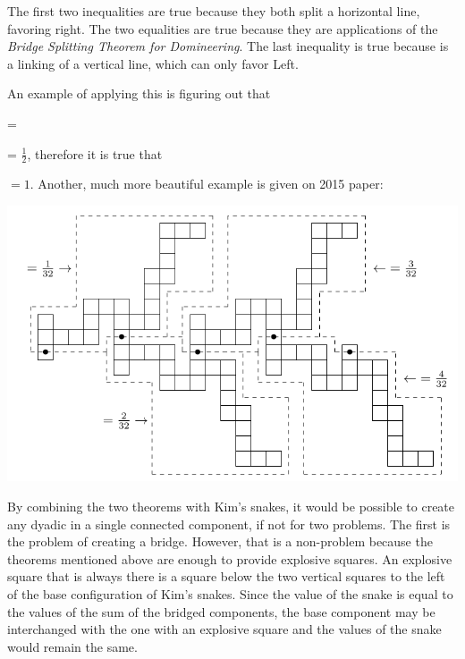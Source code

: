 The first two inequalities are true because they both split a horizontal line, favoring right. The two equalities are true because they are applications of the \textit{Bridge Splitting Theorem for Domineering}. The last inequality is true because is a linking of a vertical line, which can only favor Left.

An example of applying this is figuring out that  =
 = $\frac{1}{2}$, therefore it is true that 
 $=1$. Another, much more beautiful example is given on 2015 paper:

\includegraphics[scale=0.5]{../images/dyadic_domineering.png}

By combining the two theorems with Kim's snakes, it would be possible to create any dyadic in a single connected component, if not for two problems. The first is the problem of creating a bridge. However, that is a non-problem because the theorems mentioned above are enough to provide explosive squares. An explosive square that is always there is a square below the two vertical squares to the left of the base configuration of Kim's snakes. Since the value of the snake is equal to the values of the sum of the bridged components, the base component may be interchanged with the one with an explosive square and the values of the snake would remain the same.

